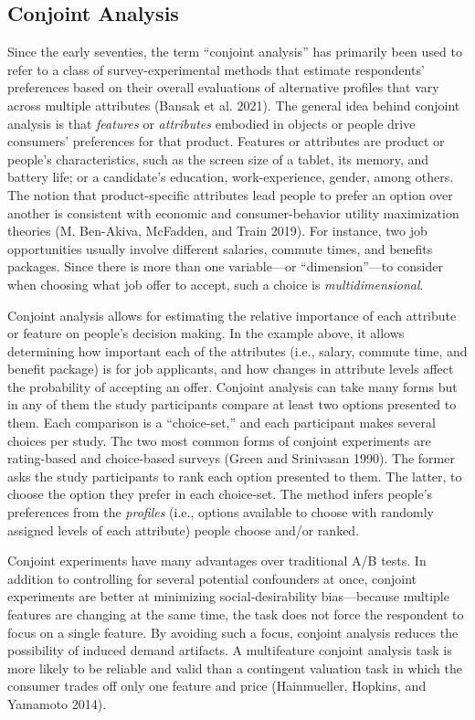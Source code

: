 \documentclass[
  12pt,
]{article}
\begin{document}
\hypertarget{conjoint-analysis}{%
\subsection{Conjoint Analysis}\label{conjoint-analysis}}

Since the early seventies, the term ``conjoint analysis'' has primarily been used to refer to a class of survey-experimental methods that estimate respondents' preferences based on their overall evaluations of alternative profiles that vary across multiple attributes (Bansak et al. 2021). The general idea behind conjoint analysis is that \emph{features} or \emph{attributes} embodied in objects or people drive consumers' preferences for that product. Features or attributes are product or people's characteristics, such as the screen size of a tablet, its memory, and battery life; or a candidate's education, work-experience, gender, among others. The notion that product-specific attributes lead people to prefer an option over another is consistent with economic and consumer-behavior utility maximization theories (M. Ben-Akiva, McFadden, and Train 2019). For instance, two job opportunities usually involve different salaries, commute times, and benefits packages. Since there is more than one variable---or ``dimension''---to consider when choosing what job offer to accept, such a choice is \emph{multidimensional}.

Conjoint analysis allows for estimating the relative importance of each attribute or feature on people's decision making. In the example above, it allows determining how important each of the attributes (i.e., salary, commute time, and benefit package) is for job applicants, and how changes in attribute levels affect the probability of accepting an offer. Conjoint analysis can take many forms but in any of them the study participants compare at least two options presented to them. Each comparison is a ``choice-set,'' and each participant makes several choices per study. The two most common forms of conjoint experiments are rating-based and choice-based surveys (Green and Srinivasan 1990). The former asks the study participants to rank each option presented to them. The latter, to choose the option they prefer in each choice-set. The method infers people's preferences from the \emph{profiles} (i.e., options available to choose with randomly assigned levels of each attribute) people choose and/or ranked.

Conjoint experiments have many advantages over traditional A/B tests. In addition to controlling for several potential confounders at once, conjoint experiments are better at minimizing social-desirability bias---because multiple features are changing at the same time, the task does not force the respondent to focus on a single feature. By avoiding such a focus, conjoint analysis reduces the possibility of induced demand artifacts. A multifeature conjoint analysis task is more likely to be reliable and valid than a contingent valuation task in which the consumer trades off only one feature and price (Hainmueller, Hopkins, and Yamamoto 2014).
\end{document}
